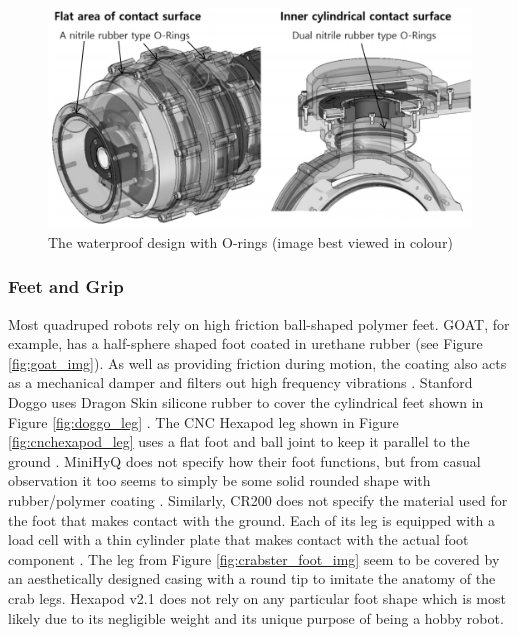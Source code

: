 \begin{figure}[H]
    \centering
    \includegraphics[width=\textwidth]{Sections/LiteratureReview/img/Crabster/crabster_watertight.jpg}
    \caption{The waterproof design with O-rings (image best viewed in colour) \cite{shim_development_2016}}
    \label{fig:crabster_watertight_img}
\end{figure}


\subsubsection{Feet and Grip}

Most quadruped robots rely on high friction ball-shaped polymer feet.
GOAT, for example, has a half-sphere shaped foot coated in urethane rubber (see Figure \ref{fig:goat_img}).
As well as providing friction during motion, the coating also acts as a mechanical damper and filters out high frequency vibrations \cite{kalouche_design_2016}.
Stanford Doggo uses Dragon Skin silicone rubber to cover the cylindrical feet shown in Figure \ref{fig:doggo_leg} \cite{kau_nate711/stanforddoggoproject_2019}.
The CNC Hexapod leg shown in Figure \ref{fig:cnchexapod_leg} uses a flat foot and ball joint to keep it parallel to the ground \cite{murshiduzzaman_hexapod_2019}.
MiniHyQ does not specify how their foot functions, but from casual observation it too seems to simply be some solid rounded shape with rubber/polymer coating \cite{khan_minihyq_2015}. Similarly, CR200 does not specify the material used for the foot that makes contact with the ground. Each of its leg is equipped with a load cell with a thin cylinder plate that makes contact with the actual foot component \cite{shim_development_2016}. The leg from Figure \ref{fig:crabster_foot_img} seem to be covered by an aesthetically designed casing with a round tip to imitate the anatomy of the crab legs. Hexapod v2.1 does not rely on any particular foot shape which is most likely due to its negligible weight and its unique purpose of being a hobby robot.

